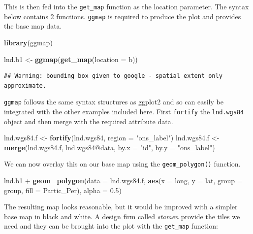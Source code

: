 \documentclass[]{article}
\newenvironment{Shaded}{}{}
\newcommand{\KeywordTok}[1]{\textcolor[rgb]{0.00,0.44,0.13}{\textbf{{#1}}}}
\newcommand{\DataTypeTok}[1]{\textcolor[rgb]{0.56,0.13,0.00}{{#1}}}
\newcommand{\FloatTok}[1]{\textcolor[rgb]{0.25,0.63,0.44}{{#1}}}
\newcommand{\StringTok}[1]{\textcolor[rgb]{0.25,0.44,0.63}{{#1}}}
\newcommand{\NormalTok}[1]{{#1}}
\begin{document}
This is then fed into the \texttt{get\_map} function as the location
parameter. The syntax below contains 2 functions. \texttt{ggmap} is
required to produce the plot and provides the base map data.

\begin{Shaded}
\begin{Highlighting}[]
\KeywordTok{library}\NormalTok{(ggmap)}

\NormalTok{lnd.b1 <- }\KeywordTok{ggmap}\NormalTok{(}\KeywordTok{get_map}\NormalTok{(}\DataTypeTok{location =} \NormalTok{b))}
\end{Highlighting}
\end{Shaded}

\begin{verbatim}
## Warning: bounding box given to google - spatial extent only approximate.
\end{verbatim}

\texttt{ggmap} follows the same syntax structures as ggplot2 and so can
easily be integrated with the other examples included here. First
\texttt{fortify} the \texttt{lnd.wgs84} object and then merge with the
required attribute data.

\begin{Shaded}
\begin{Highlighting}[]
\NormalTok{lnd.wgs84.f <- }\KeywordTok{fortify}\NormalTok{(lnd.wgs84, }\DataTypeTok{region =} \StringTok{"ons_label"}\NormalTok{)}
\NormalTok{lnd.wgs84.f <- }\KeywordTok{merge}\NormalTok{(lnd.wgs84.f, lnd.wgs84@data, }\DataTypeTok{by.x =} \StringTok{"id"}\NormalTok{, }\DataTypeTok{by.y =} \StringTok{"ons_label"}\NormalTok{)}
\end{Highlighting}
\end{Shaded}

We can now overlay this on our base map using the
\texttt{geom\_polygon()} function.

\begin{Shaded}
\begin{Highlighting}[]
\NormalTok{lnd.b1 + }\KeywordTok{geom_polygon}\NormalTok{(}\DataTypeTok{data =} \NormalTok{lnd.wgs84.f, }\KeywordTok{aes}\NormalTok{(}\DataTypeTok{x =} \NormalTok{long, }\DataTypeTok{y =} \NormalTok{lat, }\DataTypeTok{group =} \NormalTok{group, }
    \DataTypeTok{fill =} \NormalTok{Partic_Per), }\DataTypeTok{alpha =} \FloatTok{0.5}\NormalTok{)}
\end{Highlighting}
\end{Shaded}

The resulting map looks reasonable, but it would be improved with a
simpler base map in black and white. A design firm called \emph{stamen}
provide the tiles we need and they can be brought into the plot with the
\texttt{get\_map} function:
\end{document}
